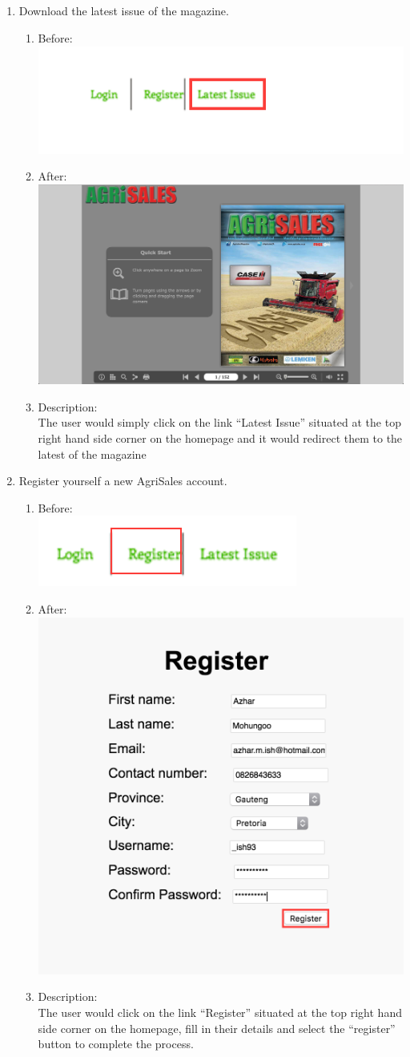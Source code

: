 \documentclass[11pt]{article}
\begin{document}
\begin{enumerate}
		\item Download the latest issue of the magazine.
			\begin{enumerate}
				\item Before: \\
					\includegraphics[width=0.7\linewidth]{../Images/Tasks/Task2Before}
				\item After: \\
					\includegraphics[width=0.5\linewidth]{../Images/Tasks/Task2After}
				\item Description: \\The user would simply click on the link “Latest Issue” situated at the top right hand side corner on the homepage and it would redirect them to the latest of the magazine
			\end{enumerate}

		\item Register yourself a new AgriSales account.
			\begin{enumerate}
				\item Before: \\
					\includegraphics[width=0.3\linewidth]{../Images/Tasks/Task3Before}
				\item After: \\
					\includegraphics[width=0.4\linewidth]{../Images/Tasks/Task3After}
					\item Description: \\The user would click on the link “Register” situated at the top right hand side corner on the homepage, fill in their details and select the “register” button to complete the process.
			\end{enumerate}
			

\end{enumerate}
\end{document}
